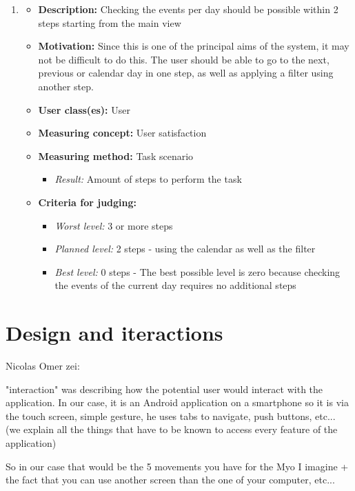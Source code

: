 \documentclass{article}
\begin{document}
\begin{enumerate}
\item 
    \begin{itemize}[label=$ $]
    \item \textbf{Description:} Checking the events per day should be possible within 2 steps starting from the main view
    \item \textbf{Motivation:} Since this is one of the principal aims of the system, it may not be difficult to do this. The user should be able to go to the next, previous or calendar day in one step, as well as applying a filter using another step.
    \item \textbf{User class(es):} User
    \item \textbf{Measuring concept:} User satisfaction
    \item \textbf{Measuring method:} Task scenario
        \begin{itemize}
        \item \textit{Result:} Amount of steps to perform the task
        \end{itemize}
    \item \textbf{Criteria for judging:}
        \begin{itemize}
        \item \textit{Worst level:} 3 or more steps
        \item \textit{Planned level:} 2 steps - using the calendar as well as the filter
        \item \textit{Best level:} 0 steps - The best possible level is zero because checking the events of the current day requires no additional steps
        \end{itemize}
    \end{itemize}
\end{enumerate}
    


\section{Design and iteractions}
 Nicolas Omer zei:

"interaction" was describing how the potential user would interact with the application. In our case, it is an Android application on a smartphone so it is via the touch screen, simple gesture, he uses tabs to navigate, push buttons, etc... (we explain all the things that have to be known to access every feature of the application)

So in our case that would be the 5 movements you have for the Myo I imagine + the fact that you can use another screen than the one of your computer, etc...
\end{document}
